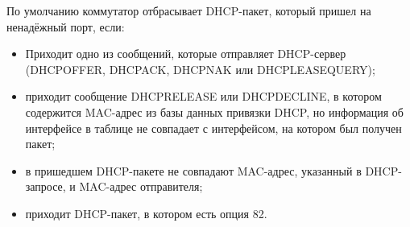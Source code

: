По умолчанию коммутатор отбрасывает DHCP-пакет, который пришел на ненадёжный порт, если:
\begin{itemize}
	\item Приходит одно из сообщений, которые отправляет DHCP-сервер (DHCPOFFER, DHCPACK, DHCPNAK или DHCPLEASEQUERY);
	\item приходит сообщение DHCPRELEASE или DHCPDECLINE, в котором содержится MAC-адрес из базы данных привязки DHCP, но информация об интерфейсе в таблице не совпадает с интерфейсом, на котором был получен пакет;
	\item в пришедшем DHCP-пакете не совпадают MAC-адрес, указанный в DHCP-запросе, и MAC-адрес отправителя;
	\item приходит DHCP-пакет, в котором есть опция 82.
\end{itemize}
